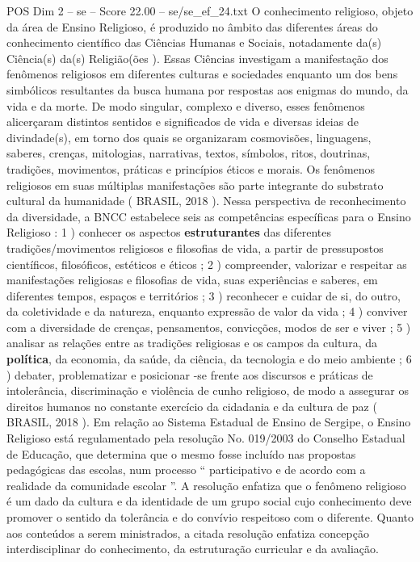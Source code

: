 \begin{textsample}{POS Dim 2 – se – Score 22.00 – se/se\_ef\_24.txt}
O conhecimento religioso, objeto da área de Ensino Religioso, é produzido no âmbito das diferentes áreas do conhecimento científico das Ciências Humanas e Sociais, notadamente da(s) Ciência(s) da(s) Religião(ões ).
Essas Ciências investigam a manifestação dos fenômenos religiosos em diferentes culturas e sociedades enquanto um dos bens simbólicos resultantes da busca humana por respostas aos enigmas do mundo, da vida e da morte.
De modo singular, complexo e diverso, esses fenômenos alicerçaram distintos sentidos e significados de vida e diversas ideias de divindade(s), em torno dos quais se organizaram cosmovisões, linguagens, saberes, crenças, mitologias, narrativas, textos, símbolos, ritos, doutrinas, tradições, movimentos, práticas e princípios éticos e morais.
Os fenômenos religiosos em suas múltiplas manifestações são parte integrante do substrato cultural da humanidade ( BRASIL, 2018 ).
Nessa perspectiva de reconhecimento da diversidade, a BNCC estabelece seis as competências específicas para o Ensino Religioso : 1 ) conhecer os aspectos \textbf{estruturantes} das diferentes tradições/movimentos religiosos e filosofias de vida, a partir de pressupostos científicos, filosóficos, estéticos e éticos ; 2 ) compreender, valorizar e respeitar as manifestações religiosas e filosofias de vida, suas experiências e saberes, em diferentes tempos, espaços e territórios ; 3 ) reconhecer e cuidar de si, do outro, da coletividade e da natureza, enquanto expressão de valor da vida ; 4 ) conviver com a diversidade de crenças, pensamentos, convicções, modos de ser e viver ; 5 ) analisar as relações entre as tradições religiosas e os campos da cultura, da \textbf{política}, da economia, da saúde, da ciência, da tecnologia e do meio ambiente ; 6 ) debater, problematizar e posicionar -se frente aos discursos e práticas de intolerância, discriminação e violência de cunho religioso, de modo a assegurar os direitos humanos no constante exercício da cidadania e da cultura de paz ( BRASIL, 2018 ).
Em relação ao Sistema Estadual de Ensino de Sergipe, o Ensino Religioso está regulamentado pela resolução No. 019/2003 do Conselho Estadual de Educação, que determina que o mesmo fosse incluído nas propostas pedagógicas das escolas, num processo “ participativo e de acordo com a realidade da comunidade escolar ”.
A resolução enfatiza que o fenômeno religioso é um dado da cultura e da identidade de um grupo social cujo conhecimento deve promover o sentido da tolerância e do convívio respeitoso com o diferente.
Quanto aos conteúdos a serem ministrados, a citada resolução enfatiza concepção interdisciplinar do conhecimento, da estruturação curricular e da avaliação.

\end{textsample}
